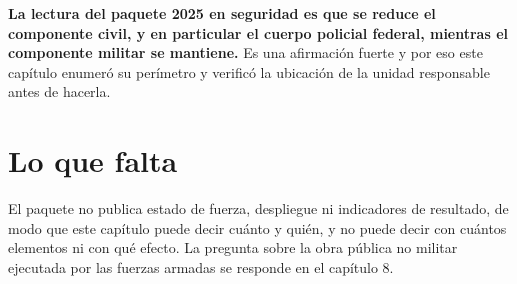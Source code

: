 \textbf{La lectura del paquete 2025 en seguridad es que se reduce el componente
civil, y en particular el cuerpo policial federal, mientras el componente militar
se mantiene.} Es una afirmación fuerte y por eso este capítulo enumeró su
perímetro y verificó la ubicación de la unidad responsable antes de hacerla.

\section{Lo que falta}

El paquete no publica estado de fuerza, despliegue ni indicadores de resultado, de
modo que este capítulo puede decir cuánto y quién, y no puede decir con cuántos
elementos ni con qué efecto. La pregunta sobre la obra pública no militar
ejecutada por las fuerzas armadas se responde en el capítulo 8.

\clearpage
